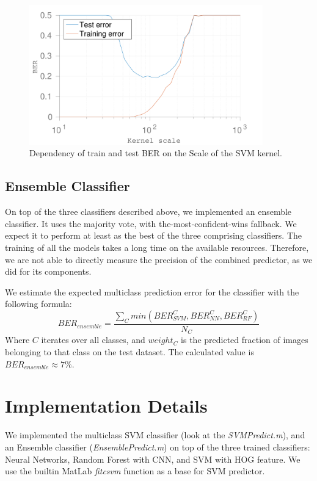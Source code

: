 \documentclass{article} %
\begin{document}
\begin{figure}[!t]
  \centering
  \includegraphics[width=0.9\textwidth]{figures/kernel_scale_ber.pdf}
  \caption{Dependency of train and test BER on the Scale of the SVM kernel.}
  \label{fig:SVMKernelScaleBER}
\end{figure}

\subsection{Ensemble Classifier}

On top of the three classifiers described above, we implemented an ensemble classifier. It uses the majority vote, with the-most-confident-wins fallback. We expect it to perform at least as the best of the three comprising classifiers. The training of all the models takes a long time on the available resources. Therefore, we are not able to directly measure the precision of the combined predictor, as we did for its components.

We estimate the expected multiclass prediction error for the classifier with the following formula:
\[
BER_{ensemble} = \frac{\sum_C min(BER_{SVM}^C, BER_{NN}^C, BER_{RF}^C)}{N_C}
\]
Where $C$ iterates over all classes, and $weight_C$ is the predicted fraction of images belonging to that class on the test dataset. The calculated value is $BER_{ensemble} \approx 7\%$.

\section{Implementation Details}

We implemented the multiclass SVM classifier (look at the \emph{SVMPredict.m}), and an Ensemble classifier (\emph{EnsemblePredict.m}) on top of the three trained classifiers: Neural Networks, Random Forest with CNN, and SVM with HOG feature. We use the builtin MatLab \emph{fitcsvm} function as a base for SVM predictor.
\end{document}
